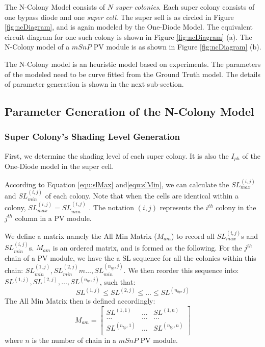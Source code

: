 The N-Colony Model consists of $N$  \textit{super colonies}. Each super colony consists of one bypass diode and one \textit{super cell}. The super sell is as circled in Figure \ref{fig:ncDiagram}, and is again modeled by the One-Diode Model. The equivalent circuit diagram for one such colony is shown in Figure \ref{fig:ncDiagram} (a). The N-Colony model of a $mSnP$ PV module is as shown in Figure \ref{fig:ncDiagram} (b).

The N-Colony model is an heuristic model based on experiments. The parameters of the modeled need to be curve fitted from the Ground Truth model. The details of parameter generation is shown in the next sub-section.
\subsection{Parameter Generation of the N-Colony Model}
\subsubsection{Super Colony's Shading Level Generation}
First, we determine the shading level of each super colony. It is also the $I_{ph}$ of the One-Diode model in the super cell.

According to Equation \ref{equ:slMax} and\ref{equ:slMin}, we can calculate the $SL_{max}^{(i,j)}$ and $SL_{min}^{(i,j)}$ of each colony. Note that when the cells are identical within a colony, $SL_{max}^{(i,j)} = SL_{min}^{(i,j)}$ . The notation $(i,j)$ represents the $i^{th}$ colony in the $j^{th}$ column in a PV module.

We define a matrix namely the All Min Matrix ($M_{am}$) to record all $SL_{max}^{(i,j)}$s and $SL_{min}^{(i,j)}$s. $M_{am}$ is an ordered matrix, and is formed as the following. For the $j^{th}$ chain of a PV module, we have the a SL sequence for all the colonies within this chain: $SL_{min}^{(1,j)},SL_{min}^{(2,j)}m \dots,SL_{min}^{(n_{bp},j)}$. We then reorder this sequence into: $SL^{(1,j)},SL^{(2,j)}, \dots,SL^{(n_{bp},j)}$, such that:
\begin{equation}\label{equ:slChain}
  SL^{(1,j)} \le SL^{(2,j)} \le \dots \le SL^{(n_{bp},j)}
\end{equation}
The All Min Matrix then is defined accordingly:
\begin{equation}\label{equ:Mam}
M_{am} =
\begin{bmatrix}
 SL^{(1,1)} & \dots & SL^{(1,n)} \\
 \dots & \dots & \dots \\
 SL^{(n_{bp},1)} & \dots & SL^{(n_{bp},n)} \\
\end{bmatrix}
\end{equation}
where $n$ is the number of chain in a $mSnP$ PV module.


